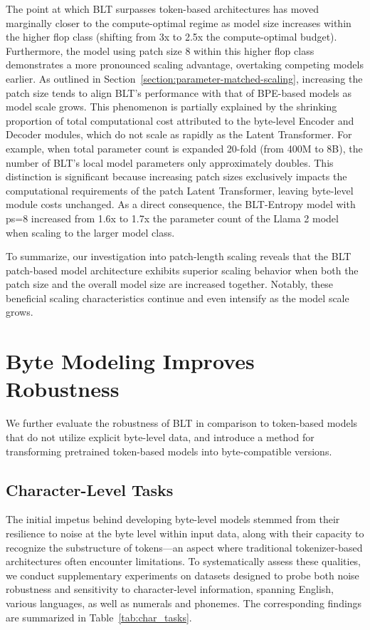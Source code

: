 The point at which {\textsc BLT} surpasses token-based architectures has moved marginally closer to the compute-optimal regime as model size increases within the higher flop class (shifting from 3x to 2.5x the compute-optimal budget). Furthermore, the model using patch size 8 within this higher flop class demonstrates a more pronounced scaling advantage, overtaking competing models earlier. As outlined in Section~\ref{section:parameter-matched-scaling}, increasing the patch size tends to align {\textsc BLT}'s performance with that of BPE-based models as model scale grows. This phenomenon is partially explained by the shrinking proportion of total computational cost attributed to the byte-level Encoder and Decoder modules, which do not scale as rapidly as the Latent Transformer. For example, when total parameter count is expanded 20-fold (from 400M to 8B), the number of {\textsc BLT}'s local model parameters only approximately doubles. This distinction is significant because increasing patch sizes exclusively impacts the computational requirements of the patch Latent Transformer, leaving byte-level module costs unchanged. As a direct consequence, the {\textsc BLT}-Entropy model with ps=8 increased from 1.6x to 1.7x the parameter count of the Llama 2 model when scaling to the larger model class.

To summarize, our investigation into patch-length scaling reveals that the {\textsc BLT} patch-based model architecture exhibits superior scaling behavior when both the patch size and the overall model size are increased together. Notably, these beneficial scaling characteristics continue and even intensify as the model scale grows.

\section{Byte Modeling Improves Robustness} We further evaluate the robustness of {\textsc BLT} in comparison to token-based models that do not utilize explicit byte-level data, and introduce a method for transforming pretrained token-based models into byte-compatible versions.
\label{sec:robustness}

\subsection{Character-Level Tasks}

The initial impetus behind developing byte-level models stemmed from their resilience to noise at the byte level within input data, along with their capacity to recognize the substructure of tokens—an aspect where traditional tokenizer-based architectures often encounter limitations. To systematically assess these qualities, we conduct supplementary experiments on datasets designed to probe both noise robustness and sensitivity to character-level information, spanning English, various languages, as well as numerals and phonemes. The corresponding findings are summarized in Table~\ref{tab:char_tasks}.

